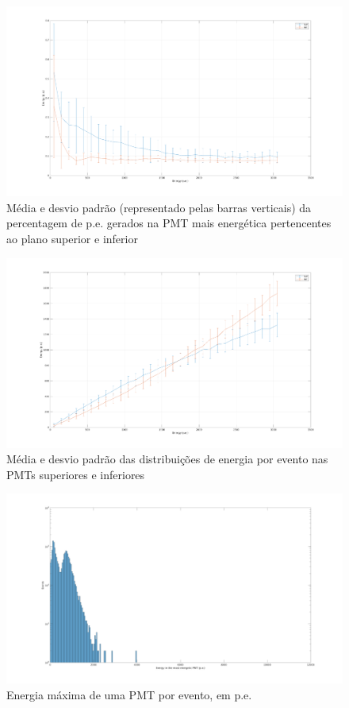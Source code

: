 \begin{figure}[H]
	\centering
	\includegraphics[width=16cm]{postextuais/apendice/simantes/errorbarene.png}
	\caption{Média e desvio padrão (representado pelas barras verticais) da percentagem de p.e. gerados na PMT mais energética pertencentes ao plano superior e inferior }
	\label{fig:transf}
\end{figure}

\begin{figure}[H]
	\centering
	\includegraphics[width=16cm]{postextuais/apendice/simantes/errorbarmosten.png}
	\caption{Média e desvio padrão das distribuições de energia por evento nas PMTs superiores e inferiores }
	\label{fig:transf}
\end{figure}

\begin{figure}[H]
	\centering
	\includegraphics[width=16cm]{postextuais/apendice/simantes/mosten_pmt.png}
	\caption{Energia máxima de uma PMT por evento, em p.e. }
	\label{fig:transf}
\end{figure}

